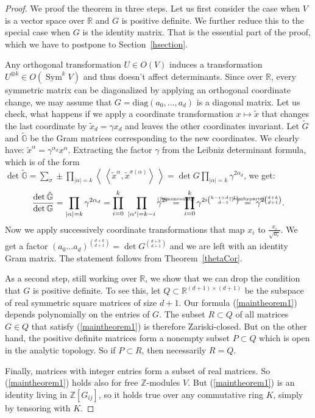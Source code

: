 \documentclass{amsart}
\DeclareMathOperator{\Sym}{Sym}
\newcommand{\bra}{\left<\!\!\!\:\left<}
\newcommand{\ket}{\right>\!\!\!\:\right>}
\newcommand{\myeq}[1]{\mathrel{\overset{\makebox[0pt]{\text{\tiny #1}}}{=}}}
\newcommand{\G}{\mathbb{G}}
\newcommand{\R}{\mathbb{R}}
\newcommand{\Z}{\mathbb{Z}}
\theoremstyle{plain}
\theoremstyle{definition}
\theoremstyle{remark}
\begin{document}
\begin{proof}
We proof the theorem in three steps.
Let us first consider the case when $V$ is a vector space over $\R$ and $G$ is positive definite. We further reduce this to the special case when $G$ is the identity matrix. That is the essential part of the proof, which we have to postpone to Section~\ref{hsection}.

Any orthogonal transformation $U\in O(V)$ induces a transformation $U^{\otimes k} \in O(\Sym^k V)$ and thus doesn't affect determinants. Since over $\R$, every symmetric matrix can be diagonalized by applying an orthogonal coordinate change, we may assume that $G=\text{diag}\left(a_0,\ldots,a_d\right)$ is a diagonal matrix. 
Let us check, what happens if we apply a coordinate transformation $x\mapsto\tilde x$ that changes the last coordinate by $\tilde{x}_d = \gamma x_d$ and leaves the other coordinates invariant. Let $\tilde{G}$ and $\tilde{\G}$ be the Gram matrices corresponding to the new coordinates.
We clearly have: $\tilde{x}^\alpha = \gamma^{\alpha_d} x^\alpha$. Extracting the factor $\gamma$ from the Leibniz determinant formula, which is of the form $\det \tilde{\G}=\sum\limits_\sigma\pm\prod\limits_{|\alpha|=k} \bra \tilde{x}^{\alpha},\tilde{x}^{\sigma(\alpha)}\ket=\det G\prod\limits_{|\alpha|=k} \gamma^{2\alpha_d}$, we get: 
\vspace{-2mm}
$$
\frac{\det \tilde{\G}}{\det\G} = \prod_{|\alpha|=k}\gamma^{2\alpha_d} = \prod_{i=0}^k\ \prod_{|\alpha '|=k-i} \gamma^{2i} \; \myeq{(\ref{binomcount})}\;\prod_{i=0}^k\gamma^{2i\binom{k-i+d-1}{d-1}} \; \myeq{(\ref{sumbyparts})} \; \gamma^{2\binom{d+k}{d+1}}.
$$
Now we apply successively coordinate transformations that map $x_i$ to $\frac{x_i}{\sqrt{a_i}}$. We get a factor $(a_0\ldots a_d)^{\binom{d+k}{d+1}} = \det G^{\binom{d+k}{d+1}}$ and we are left with an identity Gram matrix. The statement follows from Theorem~\ref{thetaCor}.

As a second step, still working over $\R$, we show that we can drop the condition that $G$ is positive definite. To see this, let $Q\subset \R^{(d+1)\times(d+1)}$ be the subspace of real symmetric square matrices of size $d+1$. Our formula (\ref{maintheorem1}) depends polynomially on the entries of $G$. The subset $R\subset Q$ of all matrices $G\in Q$ that satisfy (\ref{maintheorem1}) is therefore Zariski-closed. But on the other hand, the positive definite matrices form a nonempty subset $P\subset Q$ which is open in the analytic topology. So if $P\subset R$, then necessarily $R=Q$.

Finally, matrices with integer entries form a subset of real matrices. So (\ref{maintheorem1}) holds also for free $\Z$-modules $V$. But (\ref{maintheorem1}) is an identity living in $\Z[G_{ij}]$, so it holds true over any commutative ring $K$, simply by tensoring with $K$.
\end{proof}
\end{document}
